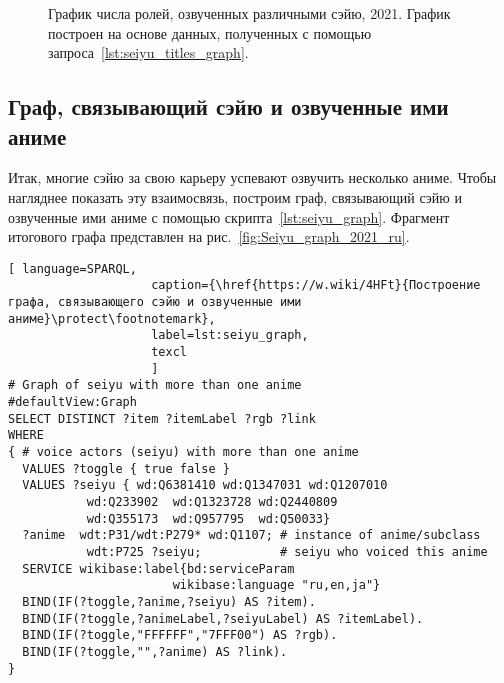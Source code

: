 \begin{figure*}[h]

    \setlength{\fboxsep}{0pt}%
    \setlength{\fboxrule}{1pt}%
	\caption[График числа ролей, озвученных различными сэйю, 2021 год.]{График числа ролей, озвученных различными сэйю, 2021. График построен на основе данных, полученных с помощью запроса~\protect\ref{lst:seiyu_titles_graph}.}%
    \label{fig:Seiyu_num_chart_2021_ru}%
\end{figure*} 

\subsection{Граф, связывающий сэйю и озвученные ими аниме}

Итак, многие сэйю за свою карьеру успевают озвучить несколько аниме. Чтобы нагляднее показать эту взаимосвязь, построим граф, связывающий сэйю и озвученные ими аниме с помощью скрипта~\ref{lst:seiyu_graph}. Фрагмент итогового графа представлен на рис.~\ref{fig:Seiyu_graph_2021_ru}. 

\newpage

\lstset{numbers=left, firstnumber=1, frame=single}
\begin{lstlisting}[ language=SPARQL, 
                    caption={\href{https://w.wiki/4HFt}{Построение графа, связывающего сэйю и озвученные ими аниме}\protect\footnotemark},
                    label=lst:seiyu_graph,
                    texcl 
                    ]
# Graph of seiyu with more than one anime
#defaultView:Graph
SELECT DISTINCT ?item ?itemLabel ?rgb ?link
WHERE
{ # voice actors (seiyu) with more than one anime
  VALUES ?toggle { true false }
  VALUES ?seiyu { wd:Q6381410 wd:Q1347031 wd:Q1207010 
           wd:Q233902  wd:Q1323728 wd:Q2440809 
           wd:Q355173  wd:Q957795  wd:Q50033}
  ?anime  wdt:P31/wdt:P279* wd:Q1107; # instance of anime/subclass
           wdt:P725 ?seiyu;           # seiyu who voiced this anime 
  SERVICE wikibase:label{bd:serviceParam
					   wikibase:language "ru,en,ja"}
  BIND(IF(?toggle,?anime,?seiyu) AS ?item).
  BIND(IF(?toggle,?animeLabel,?seiyuLabel) AS ?itemLabel).
  BIND(IF(?toggle,"FFFFFF","7FFF00") AS ?rgb).
  BIND(IF(?toggle,"",?anime) AS ?link).
}
\end{lstlisting}%
\lstset{numbers=none}

